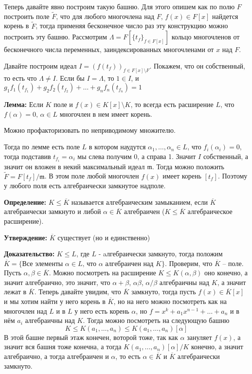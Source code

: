 \documentclass[a4paper, 12pt]{book}
\begin{document}
Теперь давайте явно построим такую башню. Для этого опишем как по полю $F$
построить поле $\widetilde F$, что для любого многочлена над $F$, $f(x)\in
F[x]$ найдется корень в $\widetilde F$, тогда применяя бесконечное число раз
эту конструкцию можно построить эту башню. Рассмотрим $\Lambda=F[\{t_f\}_{f\in F[x]}]$
кольцо многочленов от бесконечного числа переменных, заиндексированных
многочленами от $x$ над $F$.

Давайте построим идеал $I=(f(t_f))_{f\in F[x]\setminus F}$. Покажем, что он собственный, то
есть что $\Lambda\neq I$. Если бы $I=\Lambda$, то $1\in I$, и $g_1f_1(t_{f_1})+
g_2f_2(t_{f_2})+\ldots+g_nf_n(t_{f_n})=1$

\textbf{Лемма:} Если $K$ поле и $f(x)\in K[x]\setminus K$, то всегда есть расширение $L$,
что $f(\alpha)=0,\,\alpha\in L$ многочлен в нем имеет корень.

Можно профакторизовать по неприводимому множителю.

Тогда по лемме есть поле $L$ в котором наудутся $\alpha_1,\ldots,\alpha_n\in L$,
что $f_i(\alpha_i)=0$, тогда подставив $t_{f_i}=\alpha_i$ мы слева получим 0,
а справа 1. Значит $I$ собственный, а значит он вложен в некий максимальный
идеал $\mathfrak{m}$. Тогда можно положить $\widetilde{F}=F[t_f]/\mathfrak{m}$.
В этом поле любой многочлен $f(x)$ имеет корень $[t_f]$. Поэтому у любого поля
есть алгебраически замкнутое надполе.

\textbf{Определение:}  $K\le \overline K$ называется алгебраическим замыканием,
если $\overline K$ алгебраически замкнуто и либой $\alpha\in \overline K$
алгебраичен ($K\leq\overline K$ алгебраическое расширение).

\textbf{Утверждение:} $\overline K$ существует (но и единственно)

\textbf{Доказательство:} $K\le L$, где $L$ - aлгебраически замкнуто, тогда
положим $\overline K= \{\text{Все элементы $\alpha\in L$, что $\alpha$ алгебраичен
над $K$}\}$. Проверим, что $\overline K$ – поле. Пусть $\alpha,\beta\in\overline
K$. Можно посмотреть на расширение $K\le K(\alpha,\beta)$ оно конечно, а значит
алгебраично, это значит, что $\alpha+\beta$, $\alpha\beta$, $\alpha/\beta$
алгебраичны над $K$, а значит лежат в $\overline K$. Теперь давайте увидим, что
$\overline K$ замкнуто, тогда пусть $f(x)\in\overline K[x]$ и мы хотим найти у
него корень в $\overline K$, но на него можно посмотреть как на многочлен над
$L$ и в $L$ у него есть корень $\alpha$, но $f=x^k+a_1x^{n-1}+\ldots+a_n$ и
в нём $a_i$ алгебраичны над $K$. Тогда можно посмотреть на следующую башню
\[K\le K(a_1,\ldots,a_n)\le K(a_1,\ldots,a_n)[\alpha]\]
В этой башне первый этаж конечен, воторой тоже, так как $\alpha$ зануляет $f(x)$,
а значит вся башня тоже конечна, а тогда $K(a_1,\ldots,a_n)[\alpha]/K$ конечно,
а значит алгебраично, а тогда алгебраичен и $\alpha$, то есть $\alpha\in
\overline K$ и $\overline K$ алгебраически замкнуто.
\end{document}
